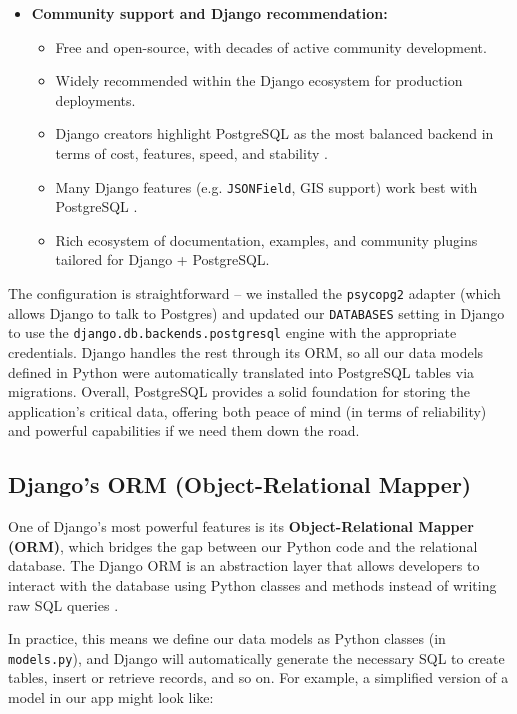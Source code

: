 \begin{itemize}
	\item \textbf{Community support and Django recommendation:} 
	\begin{itemize}
		\item Free and open-source, with decades of active community development. 
		\item Widely recommended within the Django ecosystem for production deployments. 
		\item Django creators highlight PostgreSQL as the most balanced backend in terms of cost, features, speed, and stability \parencite{DjangoDatabases,DjangoPostgresFields}. 
		\item Many Django features (e.g. \texttt{JSONField}, GIS support) work best with PostgreSQL \parencite{DjangoPostgresFields}. 
		\item Rich ecosystem of documentation, examples, and community plugins tailored for Django + PostgreSQL. 
	\end{itemize}
\end{itemize} 

The configuration is straightforward – we installed the \texttt{psycopg2} adapter (which allows Django to talk to Postgres) and updated our \texttt{DATABASES} setting in Django to use the \texttt{django.\allowbreak db.\allowbreak backends.\allowbreak postgresql} engine with the appropriate credentials. Django handles the rest through its ORM, so all our data models defined in Python were automatically translated into PostgreSQL tables via migrations. Overall, PostgreSQL provides a solid foundation for storing the application’s critical data, offering both peace of mind (in terms of reliability) and powerful capabilities if we need them down the road.

\subsection{Django’s ORM (Object-Relational Mapper)} 

One of Django’s most powerful features is its 
\textbf{Object-Relational Mapper (ORM)}, which bridges the gap between our 
Python code and the relational database. The Django ORM is an abstraction 
layer that allows developers to interact with the database using Python 
classes and methods instead of writing raw SQL queries \parencite{DjangoORMQueries}. 

In practice, this means we define our data models as Python classes (in 
\texttt{models.py}), and Django will automatically generate the necessary SQL 
to create tables, insert or retrieve records, and so on. For example, a 
simplified version of a model in our app might look like: 


